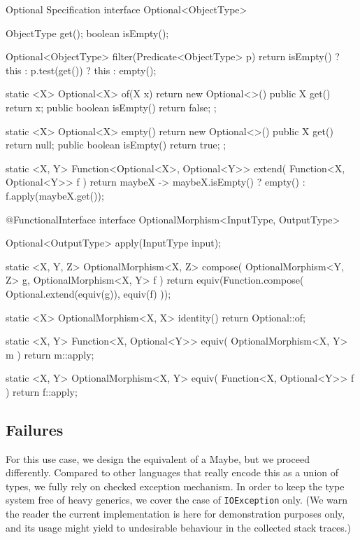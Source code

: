 \documentclass[12pt,a4paper]{report}
\renewcommand{\baselinestretch}{1.5}
\theoremstyle{theorem}
\theoremstyle{definition}
\begin{document}
\begin{javacode}{Optional Specification}
interface Optional<ObjectType>
{
  ObjectType get();
  boolean isEmpty();
  
  Optional<ObjectType> filter(Predicate<ObjectType> p)
    { return isEmpty() ? this
             : p.test(get()) ? this
             : empty(); }
  
  static <X> Optional<X> of(X x)
    { return new Optional<>() {
        public X get()
          { return x; }
        public boolean isEmpty()
          { return false; }
    } ; }
  
  static <X> Optional<X> empty()
    { return new Optional<>() {
        public X get()
          { return null; }
        public boolean isEmpty()
          { return true; }
    } ; }

  static <X, Y> Function<Optional<X>, Optional<Y>> extend(
    Function<X, Optional<Y>> f
  ) {
    return maybeX -> maybeX.isEmpty()
                     ? empty()
                     : f.apply(maybeX.get());
  }
}

@FunctionalInterface
interface OptionalMorphism<InputType, OutputType>
{
  Optional<OutputType> apply(InputType input);
	
  static <X, Y, Z> OptionalMorphism<X, Z> compose(
    OptionalMorphism<Y, Z> g,
    OptionalMorphism<X, Y> f
  )
    { return equiv(Function.compose(
      Optional.extend(equiv(g)), equiv(f)
    )); }
    
  static <X> OptionalMorphism<X, X> identity()
    { return Optional::of; }
  
  static <X, Y> Function<X, Optional<Y>> equiv(
    OptionalMorphism<X, Y> m
  )
    { return m::apply; }
  
  static <X, Y> OptionalMorphism<X, Y> equiv(
    Function<X, Optional<Y>> f
  )
    { return f::apply; }
}
\end{javacode}

\renewcommand{\baselinestretch}{1.5} 
\selectfont

\subsection{Failures}

For this use case, we design the equivalent of a Maybe,
but we proceed differently. Compared to other languages that really encode
this as a union of types, we fully rely on
checked exception mechanism. In order to keep the type system
free of heavy generics, we cover the case of \lstinline{IOException}{}
only. (We warn the reader the current implementation is here for demonstration
purposes only, and its usage might yield to undesirable behaviour
in the collected stack traces.)
\end{document}
